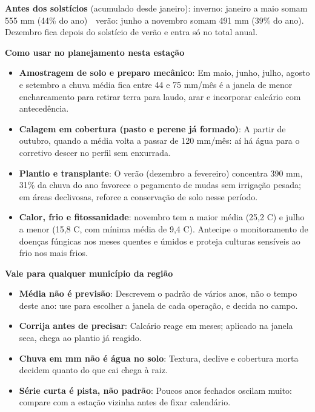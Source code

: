 \documentclass[10pt,a4paper]{article}
\begin{document}
\vspace{1pt}
{\footnotesize\textbf{Antes dos solstícios} (acumulado desde janeiro):
inverno: janeiro a maio somam 555 mm (44\% do ano) \,\textbullet\, verão: junho a novembro somam 491 mm (39\% do ano). Dezembro fica depois do solstício de verão e entra só no total
anual.}

\vspace{2pt}
{\bfseries\small Como usar no planejamento nesta estação}

\footnotesize\begin{itemize}\setlength{\itemsep}{0.5pt}
  \item \textbf{Amostragem de solo e preparo mecânico}: Em maio, junho, julho, agosto e setembro a chuva média fica entre 44 e 75 mm/mês \textemdash{} é a janela de menor encharcamento para retirar terra para laudo, arar e incorporar calcário com antecedência.
  \item \textbf{Calagem em cobertura (pasto e perene já formado)}: A partir de outubro, quando a média volta a passar de 120 mm/mês: aí há água para o corretivo descer no perfil sem enxurrada.
  \item \textbf{Plantio e transplante}: O verão (dezembro a fevereiro) concentra 390 mm, 31\% da chuva do ano \textemdash{} favorece o pegamento de mudas sem irrigação pesada; em áreas declivosas, reforce a conservação de solo nesse período.
  \item \textbf{Calor, frio e fitossanidade}: novembro tem a maior média (25,2 \textdegree{}C) e julho a menor (15,8 \textdegree{}C, com mínima média de 9,4 \textdegree{}C). Antecipe o monitoramento de doenças fúngicas nos meses quentes e úmidos e proteja culturas sensíveis ao frio nos mais frios.
\end{itemize}

\vspace{1pt}
{\bfseries\small Vale para qualquer município da região}

\scriptsize\begin{itemize}\setlength{\itemsep}{0.5pt}
  \item \textbf{Média não é previsão}: Descrevem o padrão de vários anos, não o tempo deste ano: use para escolher a janela de cada operação, e decida no campo.
  \item \textbf{Corrija antes de precisar}: Calcário reage em meses; aplicado na janela seca, chega ao plantio já reagido.
  \item \textbf{Chuva em mm não é água no solo}: Textura, declive e cobertura morta decidem quanto do que cai chega à raiz.
  \item \textbf{Série curta é pista, não padrão}: Poucos anos fechados oscilam muito: compare com a estação vizinha antes de fixar calendário.
\end{itemize}
\end{document}
